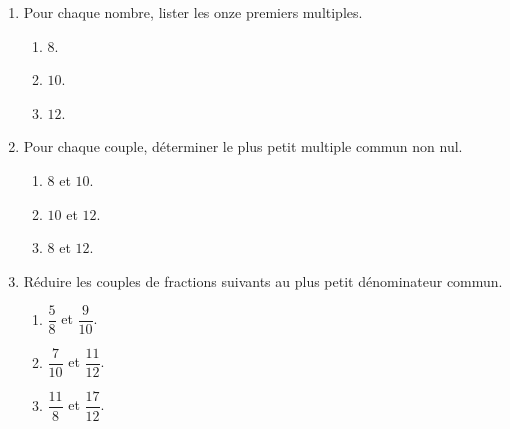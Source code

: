 \begin{exercice*}
    \begin{enumerate}
        \item Pour chaque nombre, lister les onze premiers multiples.
        \begin{multicols}{3}
            \begin{enumerate}
                \item $8$.
                \item $10$.
                \item $12$.
            \end{enumerate}
        \end{multicols}
        \item Pour chaque couple, déterminer le plus petit multiple commun non nul.
        \begin{multicols}{3}
            \begin{enumerate}
                \item $8$ et $10$.
                \item $10$ et $12$.
                \item $8$ et $12$.
            \end{enumerate}           
        \end{multicols}
        \item Réduire les couples de fractions suivants au plus petit dénominateur commun.
        \begin{multicols}{3}
            \begin{enumerate}
                \item $\dfrac{5}{8}$ et $\dfrac{9}{10}$.
                \item $\dfrac{7}{10}$ et $\dfrac{11}{12}$.
                \item $\dfrac{11}{8}$ et $\dfrac{17}{12}$.
            \end{enumerate}
        \end{multicols}
    \end{enumerate}
\end{exercice*}
